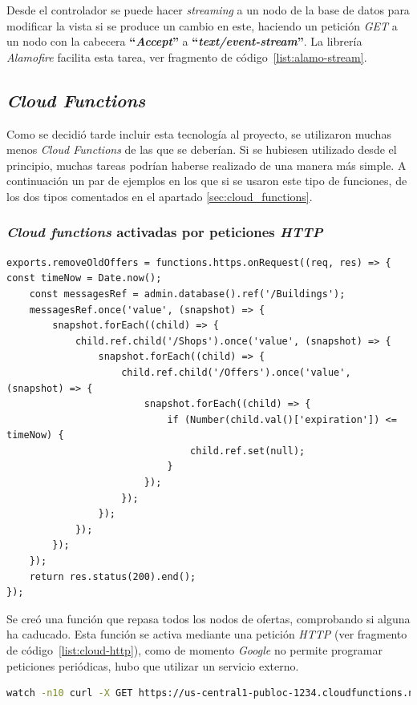 Desde el controlador se puede hacer \textit{streaming} a un nodo de la base de datos para modificar la vista si se produce un cambio en este, haciendo un petición \textit{GET} a un nodo con la cabecera \textbf{``\textit{Accept}''} a \textbf{``\textit{text/event-stream}''}. La librería \textit{Alamofire} facilita esta tarea, ver fragmento de código~\ref{list:alamo-stream}.


\subsection{\textit{Cloud Functions}}
Como se decidió tarde incluir esta tecnología al proyecto, se utilizaron muchas menos \textit{Cloud Functions} de las que se deberían. Si se hubiesen utilizado desde el principio, muchas tareas podrían haberse realizado de una manera más simple. A continuación un par de ejemplos en los que si se usaron este tipo de funciones, de los dos tipos comentados en el apartado  \ref{sec:cloud_functions}.

\subsubsection*{\textit{Cloud functions} activadas por peticiones \textit{HTTP}}
\begin{lstlisting}[style=interfaces,caption=\textit{Cloud Function} activada por petición \textit{HTTP}.,label={list:cloud-http}]
exports.removeOldOffers = functions.https.onRequest((req, res) => {
const timeNow = Date.now();
	const messagesRef = admin.database().ref('/Buildings');
	messagesRef.once('value', (snapshot) => {
		snapshot.forEach((child) => {
			child.ref.child('/Shops').once('value', (snapshot) => {
				snapshot.forEach((child) => {
					child.ref.child('/Offers').once('value', (snapshot) => {
						snapshot.forEach((child) => {
							if (Number(child.val()['expiration']) <= timeNow) {
								child.ref.set(null);
							}
						});
					});
				});
			});
		});
	});
	return res.status(200).end();
});
\end{lstlisting}

Se creó una función que repasa todos los nodos de ofertas, comprobando si alguna ha caducado. Esta función se activa mediante una petición \textit{HTTP} (ver fragmento de código~\ref{list:cloud-http}), como de momento \textit{Google} no permite programar peticiones periódicas, hubo que utilizar un servicio externo.

\begin{lstlisting}[style=interfaces,language=bash,label={list:watch},caption=Comando que ejecuta una petición \textit{HTTP} correspondiente a una \textit{Cloud Function} cada diez segundos.]
watch -n10 curl -X GET https://us-central1-publoc-1234.cloudfunctions.net/removeOldOffers
\end{lstlisting}

